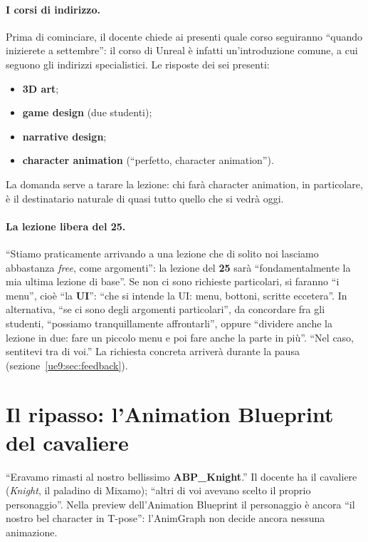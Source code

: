 \paragraph{I corsi di indirizzo.} Prima di cominciare, il docente chiede ai presenti
quale corso seguiranno ``quando inizierete a settembre'': il corso di Unreal è infatti
un'introduzione comune, a cui seguono gli indirizzi specialistici. Le risposte dei sei
presenti:
\begin{itemize}
  \item \textbf{3D art};
  \item \textbf{game design} (due studenti);
  \item \textbf{narrative design};
  \item \textbf{character animation} (``perfetto, character animation'').
\end{itemize}
La domanda serve a tarare la lezione: chi farà character animation, in particolare, è
il destinatario naturale di quasi tutto quello che si vedrà oggi.

\paragraph{La lezione libera del 25.} ``Stiamo praticamente arrivando a una lezione che
di solito noi lasciamo abbastanza \emph{free}, come argomenti'': la lezione del
\textbf{25} sarà ``fondamentalmente la mia ultima lezione di base''. Se non ci sono
richieste particolari, si faranno ``i menu'', cioè ``la \textbf{UI}'': ``che si intende
la UI: menu, bottoni, scritte eccetera''. In alternativa, ``se ci sono degli argomenti
particolari'', da concordare fra gli studenti, ``possiamo tranquillamente affrontarli'',
oppure ``dividere anche la lezione in due: fare un piccolo menu e poi fare anche la parte
in più''. ``Nel caso, sentitevi tra di voi.'' La richiesta concreta arriverà durante la
pausa (sezione~\ref{ue9:sec:feedback}).

\section{Il ripasso: l'Animation Blueprint del cavaliere}
\label{ue9:sec:ripasso}

``Eravamo rimasti al nostro bellissimo \textbf{ABP\_Knight}.'' Il docente ha il
cavaliere (\emph{Knight}, il paladino di Mixamo); ``altri di voi avevano scelto il
proprio personaggio''. Nella preview dell'Animation Blueprint il personaggio è ancora
``il nostro bel character in T-pose'': l'AnimGraph non decide ancora nessuna
animazione.

